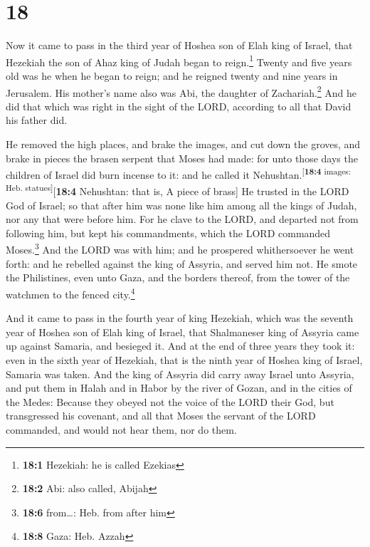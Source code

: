 \hypertarget{section-17}{%
\section{18}\label{section-17}}

 Now it came to pass in the third year of Hoshea son of
Elah king of Israel, that Hezekiah the son of Ahaz king of Judah began
to reign.\footnote{\textbf{18:1} Hezekiah: he is called Ezekias}
 Twenty and five years old was he when he began to reign;
and he reigned twenty and nine years in Jerusalem. His mother's name
also was Abi, the daughter of Zachariah.\footnote{\textbf{18:2} Abi:
  also called, Abijah}  And he did that which was right in
the sight of the LORD, according to all that David his father did.

 He removed the high places, and brake the images, and cut
down the groves, and brake in pieces the brasen serpent that Moses had
made: for unto those days the children of Israel did burn incense to it:
and he called it Nehushtan.\textsuperscript{{[}\textbf{18:4} images:
Heb. statues{]}}{[}\textbf{18:4} Nehushtan: that is, A piece of brass{]}
 He trusted in the LORD God of Israel; so that after him
was none like him among all the kings of Judah, nor any that were before
him.  For he clave to the LORD, and departed not from
following him, but kept his commandments, which the LORD commanded
Moses.\footnote{\textbf{18:6} from\ldots: Heb. from after him}
 And the LORD was with him; and he prospered whithersoever
he went forth: and he rebelled against the king of Assyria, and served
him not.  He smote the Philistines, even unto Gaza, and
the borders thereof, from the tower of the watchmen to the fenced
city.\footnote{\textbf{18:8} Gaza: Heb. Azzah}

 And it came to pass in the fourth year of king Hezekiah,
which was the seventh year of Hoshea son of Elah king of Israel, that
Shalmaneser king of Assyria came up against Samaria, and besieged it.
 And at the end of three years they took it: even in the
sixth year of Hezekiah, that is the ninth year of Hoshea king of Israel,
Samaria was taken.  And the king of Assyria did carry
away Israel unto Assyria, and put them in Halah and in Habor by the
river of Gozan, and in the cities of the Medes:  Because
they obeyed not the voice of the LORD their God, but transgressed his
covenant, and all that Moses the servant of the LORD commanded, and
would not hear them, nor do them.

